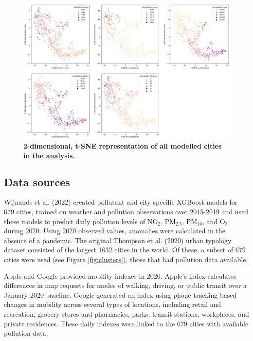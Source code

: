 \documentclass[preprint,12pt]{elsarticle}
\begin{document}
\begin{figure}
\centering
\includegraphics[trim={ 0 0 0 0 },clip,scale=0.35]{Images/City Types Dimensions.png}
\caption{\bf 2-dimensional, t-SNE representation of all modelled cities in the analysis.}
 \label{fig:Dimensions}
\end{figure}




\subsection*{Data sources}


Wijnands et al. (2022) \cite{Wijnands2022} created pollutant and city specific XGBoost models for 679 cities, trained on weather and pollution observations over 2015-2019 and used these models to predict daily pollution levels of NO$_{2}$, PM$_{2.5}$, PM$_{10}$, and O$_{3}$ during 2020. Using 2020 observed values, anomalies were calculated in the absence of a pandemic. The original Thompson et al. (2020) urban typology dataset consisted of the largest 1632 cities in the world. Of these, a subset of 679 cities were used (see Figure \ref{fig:clusters}), those that had pollution data available.

Apple \cite{Apple2020} and Google \cite{Google2020} provided mobility indexes in 2020. Apple's index calculates differences in map requests for modes of walking, driving, or public transit over a January 2020 baseline. Google generated an index using phone-tracking-based changes in mobility across several types of locations, including retail and recreation, grocery stores and pharmacies, parks, transit stations, workplaces, and private residences. These daily indexes were linked to the 679 cities with available pollution data.
\end{document}

